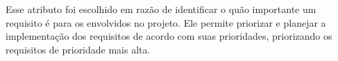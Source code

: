\begin{itemize}
\normalsize Esse atributo foi escolhido em razão de identificar o quão importante um requisito é para os envolvidos no projeto. Ele permite priorizar e planejar a implementação dos requisitos de acordo com suas prioridades, priorizando os requisitos de prioridade mais alta.


\end{itemize}

